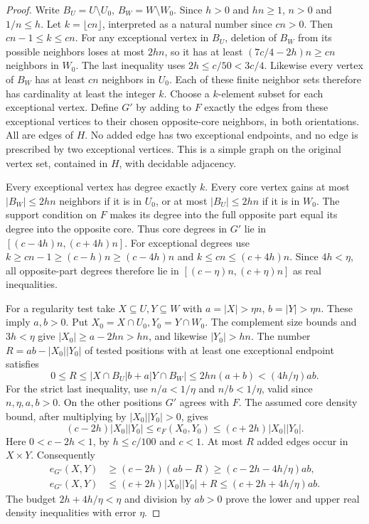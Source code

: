 \begin{proof}
Write $B_U=U\setminus U_0$, $B_W=W\setminus W_0$.
Since $h>0$ and $hn\geq1$, $n>0$ and $1/n\leq h$.
Let $k=\lfloor cn\rfloor$, interpreted as a natural number since
$cn>0$. Then $cn-1\leq k\leq cn$.
For any exceptional vertex in $B_U$, deletion of $B_W$ from
its possible neighbors loses at most $2hn$, so it has at least
$(7c/4-2h)n\geq cn$ neighbors in $W_0$. The last inequality
uses $2h\leq c/50<3c/4$. Likewise every vertex of $B_W$
has at least $cn$ neighbors in $U_0$. Each of these finite
neighbor sets therefore has cardinality at least the integer $k$.
Choose a $k$-element subset for each exceptional vertex.
Define $G'$ by adding to $F$ exactly the edges from these
exceptional vertices to their chosen opposite-core neighbors,
in both orientations. All are edges of $H$. No added edge has
two exceptional endpoints, and no edge is prescribed by two
exceptional vertices. This is a simple graph on the original
vertex set, contained in $H$, with decidable adjacency.

Every exceptional vertex has degree exactly $k$. Every core
vertex gains at most $|B_W|\leq2hn$ neighbors if it is in $U_0$,
or at most $|B_U|\leq2hn$ if it is in $W_0$.
The support condition on $F$ makes its degree into the full
opposite part equal its degree into the opposite core.
Thus core degrees in $G'$ lie in $[(c-4h)n,(c+4h)n]$.
For exceptional degrees use
$k\geq cn-1\geq(c-h)n\geq(c-4h)n$ and
$k\leq cn\leq(c+4h)n$.
Since $4h<\eta$, all opposite-part degrees therefore lie in
$[(c-\eta)n,(c+\eta)n]$ as real inequalities.

For a regularity test take $X\subseteq U,Y\subseteq W$ with
$a=|X|>\eta n$, $b=|Y|>\eta n$. These imply $a,b>0$.
Put $X_0=X\cap U_0,Y_0=Y\cap W_0$. The complement size
bounds and $3h<\eta$ give
$|X_0|\geq a-2hn>hn$, and likewise $|Y_0|>hn$.
The number $R=ab-|X_0||Y_0|$ of tested positions with at least
one exceptional endpoint satisfies
\[
0\leq R\leq|X\cap B_U|b+a|Y\cap B_W|
\leq2hn(a+b)<(4h/\eta)ab.
\]
For the strict last inequality, use $n/a<1/\eta$ and
$n/b<1/\eta$, valid since $n,\eta,a,b>0$.
On the other positions $G'$ agrees with $F$.
The assumed core density bound, after multiplying by
$|X_0||Y_0|>0$, gives
\[
(c-2h)|X_0||Y_0|\leq e_F(X_0,Y_0)
\leq(c+2h)|X_0||Y_0|.
\]
Here $0<c-2h<1$, by $h\leq c/100$ and $c<1$.
At most $R$ added edges occur in $X\times Y$. Consequently
\[
\begin{split}
e_{G'}(X,Y)&\geq(c-2h)(ab-R)
             \geq(c-2h-4h/\eta)ab,\\
e_{G'}(X,Y)&\leq(c+2h)|X_0||Y_0|+R
             \leq(c+2h+4h/\eta)ab.
\end{split}
\]
The budget $2h+4h/\eta<\eta$ and division by $ab>0$ prove
the lower and upper real density inequalities with error $\eta$.


\end{proof}
